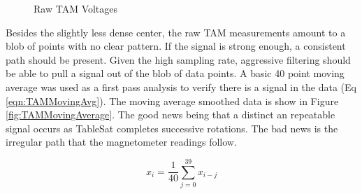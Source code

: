 \begin{figure}[H]
\centerline{}
\caption{Raw TAM Voltages}
\label{fig:TAMRaw}
\end{figure}

Besides the slightly less dense center, the raw TAM measurements amount to a blob of points with no clear pattern.  If the signal is strong enough, a consistent path should be present.  Given the high sampling rate, aggressive filtering should be able to pull a signal out of the blob of data points.  A basic 40 point moving average was used as a first pass analysis to verify there is a signal in the data (Eq \ref{eqn:TAMMovingAvg}).  The moving average smoothed data is show in Figure \ref{fig:TAMMovingAverage}.  The good news being that a distinct an repeatable signal occurs as TableSat completes successive rotations.  The bad news is the irregular path that the magnetometer readings follow.

\begin{equation}
  x_i = \frac{1}{40} \sum^{39}_{j=0} x_{i-j}
  \label{eqn:TAMMovingAvg}
\end{equation}

